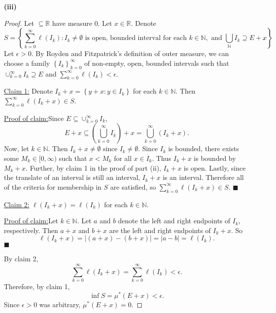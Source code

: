 \documentclass[12pt]{article}
\newenvironment{claimproof}[1]{\par\noindent\underline{Proof of claim:}\space#1}{\hfill $\blacksquare$}
\begin{document}
{\bf (iii)}
\begin{proof}
Let $\subseteq \mathbb{R}$ have measure 0. Let $x \in \mathbb{R}$. Denote 
\[ S = \left\{ \sum_{k=0}^{\infty}\ell(I_{k}) : I_{k} \neq \emptyset\text{ is
open, bounded interval for each }k \in \mathbb{N}, \text{ and }\bigcup_{\mathbb{N}}I_{k}\supseteq E + x \right\}. \]
Let $\epsilon > 0$. By Royden and Fitzpatrick's definition of outer measure, we can choose a family $\left\{ I_{k} \right\}_{k=0}^{\infty}$ of
non-empty, open, bounded intervals such that $\cup_{k=0}^{\infty}I_{k}\supseteq E$ and $\sum_{k=0}^{\infty}\ell(I_{k}) < \epsilon$.

\underline{Claim 1:} Denote $I_{k} + x = \left\{ y + x : y \in I_{k} \right\}$ for each $k \in \mathbb{N}$. Then $\sum_{k=0}^{\infty}\ell(I_{k} + x) \in S$.

\begin{claimproof}
Since $E\subseteq \cup_{k=0}^{\infty}I_{k}$, 
\[ E + x \subseteq \left( \bigcup_{k=0}^{\infty} I_{k}\right) + x = \bigcup_{k=0}^{\infty}(I_{k} + x). \]
Now, let $k \in \mathbb{N}$. Then $I_{k} + x \neq \emptyset$ since $I_{k} \neq \emptyset$. Since $I_{k}$ is bounded, 
there exists some $M_{k} \in [0, \infty)$ such that $x < M_{k}$ for all $x \in I_{k}$. Thus $I_{k} + x$ is bounded by $M_{k} + x$. 
Further, by claim 1 in the proof of part (ii), $I_{k} + x$ is open. Lastly, since the translate of an interval is still an interval, $I_{k} + x$ is an interval. 
Therefore all of the criteria for membership in $S$ are satisfied, so $\sum_{k=0}^{\infty}\ell(I_{k} + x) \in S$.
\end{claimproof}

\underline{Claim 2:} $\ell(I_{k} + x) = \ell(I_{k})$ for each $k \in \mathbb{N}$.

\begin{claimproof}
Let $k\in\mathbb{N}$. Let $a$ and $b$ denote the left and right endpoints of $I_{k}$, respectively. Then $a + x$ and $b + x$ are the left and right
endpoints of $I_{k} + x$. So 
\[ \ell(I_{k} + x) = |(a + x) - (b + x)| = |a - b| = \ell(I_{k}). \]
\end{claimproof}

By claim 2,
\[ \sum_{k=0}^{\infty}\ell(I_{k} + x) = \sum_{k=0}^{\infty}\ell(I_{k}) < \epsilon. \]
Therefore, by claim 1, 
\[ \inf S = \mu^{*}(E + x) < \epsilon. \]
Since $\epsilon > 0$ was arbitrary, $\mu^{*}(E + x) = 0$.
\end{proof}
\end{document}
